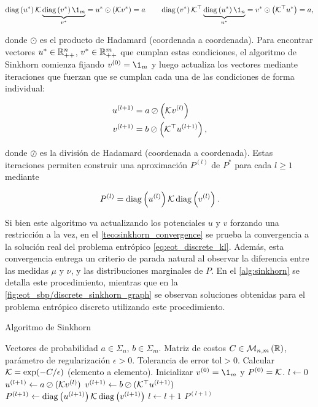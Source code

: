 \begin{equation*}
	\diag{u^*}\gibbs\underbrace{\diag{v^*} \1_m}_{v^*} = u^* \odot \parent{\gibbs v^*} = a
	\qquad
	\diag{v^*}\gibbs^\top\underbrace{\diag{u^*} \1_n}_{u^*} = v^* \odot \parent{\gibbs^\top u^*} = a ,
\end{equation*}

donde $\odot$ es el producto de Hadamard (coordenada a coordenada). Para encontrar vectores $u^*\in\mathbb{R}^n_{++}$, $v^*\in\mathbb{R}^m_{++}$ que cumplan estas condiciones, el algoritmo de Sinkhorn comienza fijando $v^{(0)}=\1_m$ y luego actualiza los vectores mediante iteraciones que fuerzan que se cumplan cada una de las condiciones de forma individual:

\begin{align}
	u^{(l+1)} &= a \oslash \left(\mathcal{K} v^{(l)}\right)\label{eq:sinkhorn_u_update}\\
	v^{(l+1)} &= b \oslash \left(\mathcal{K}^\top u^{(l+1)}\right)\label{eq:sinkhorn_v_update},
\end{align}

donde $\oslash$ es la división de Hadamard (coordenada a coordenada). Estas iteraciones permiten construir una aproximación $P^{(l)}$ de $P^*$ para cada $l\geq 1$ mediante

\begin{equation*}
	P^{(l)} = \operatorname{diag}\left(u^{(l)}\right)\mathcal{K}\operatorname{diag}\left(v^{(l)}\right).
\end{equation*}

Si bien este algoritmo va actualizando los potenciales $u$ y $v$ forzando una restricción a la vez, en el \autoref{teo:sinkhorn_convergence} se prueba la convergencia a la solución real del problema entrópico \eqref{eq:eot_discrete_kl}. Además, esta convergencia entrega un criterio de parada natural al observar la diferencia entre las medidas $\mu$ y $\nu$, y las distribuciones marginales de $P$. En el \autoref{alg:sinkhorn} se detalla este procedimiento, mientras que en la \autoref{fig:eot_sbp/discrete_sinkhorn_graph} se observan soluciones obtenidas para el problema entrópico discreto utilizando este procedimiento.

\begin{algorithm}
	\caption{Algoritmo de Sinkhorn}
   \label{alg:sinkhorn}
   \begin{algorithmic}[1]
   \Require Vectores de probabilidad $a\in\Sigma_n$, $b\in\Sigma_m$.
   \Require Matriz de costos $C\in\mathcal{M}_{n,m}\left(\mathbb{R}\right)$, parámetro de regularización $\epsilon > 0$.
   \Require Tolerancia de error $\text{tol} > 0$.
   \State Calcular $\mathcal{K} = \exp(-C/\epsilon)$ (elemento a elemento).
   \State Inicializar $v^{(0)} = \1_m$ y $P^{(0)}=\mathcal{K}$.
   \State $l \gets 0$
	   \State $u^{(l+1)} \gets a \oslash (\mathcal{K} v^{(l)})$
	   \State $v^{(l+1)} \gets b \oslash (\mathcal{K}^\top u^{(l+1)})$
	   \State $P^{(l+1)} \gets \operatorname{diag}\left(u^{(l+1)}\right)\mathcal{K}\operatorname{diag}\left(v^{(l+1)}\right)$
	   \State $l \gets l + 1$
   \EndWhile
   \State \Return $P^{(l+1)}$
   \end{algorithmic}
   \end{algorithm}

